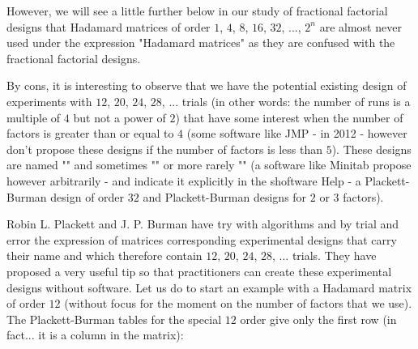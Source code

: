	However, we will see a little further below in our study of fractional factorial designs that Hadamard matrices of order $1$, $4$, $8$, $16$, $32$, ..., $2^n$ are almost never used under the expression "Hadamard matrices" as they are confused with the fractional factorial designs.
	
	By cons, it is interesting to observe that we have the potential existing design of experiments with $12$, $20$, $24$, $28$, ... trials (in other words:  the number of runs is a multiple of $4$ but not a power of $2$) that have some interest when the number of factors is greater than or equal to $4$ (some software like JMP - in 2012 - however don't propose these designs if the number of factors is less than $5$). These designs are named "" and sometimes "" or more rarely "" (a software like Minitab propose however arbitrarily - and indicate it explicitly in the shoftware Help - a Plackett-Burman design of order $32$ and Plackett-Burman designs for $2$ or $3$ factors).

	 Robin L. Plackett and J. P. Burman have try with algorithms and by trial and error the expression of matrices corresponding  experimental designs that carry their name and which therefore contain $12$, $20$, $24$, $28$, ... trials. They have proposed a very useful tip so that practitioners can create these experimental designs without software. Let us do to start an example  with a Hadamard matrix of order $12$ (without focus for the moment on the number of factors that we use). The Plackett-Burman tables for the special $12$ order give only the first row (in fact... it is a column in the matrix):
	 
